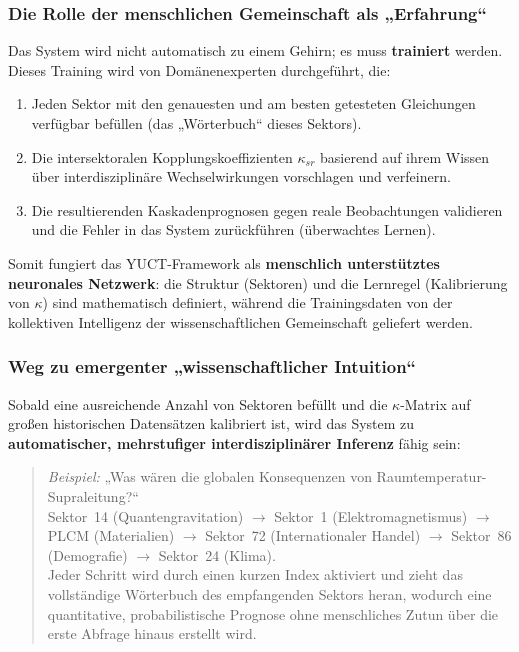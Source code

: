 \documentclass[13pt,a4paper]{article}
\begin{document}
	\subsubsection*{Die Rolle der menschlichen Gemeinschaft als „Erfahrung“}
	Das System wird nicht automatisch zu einem Gehirn; es muss \textbf{trainiert} werden.
	Dieses Training wird von Domänenexperten durchgeführt, die:
	\begin{enumerate}[leftmargin=*]
		\item Jeden Sektor mit den genauesten und am besten getesteten Gleichungen
		verfügbar befüllen (das „Wörterbuch“ dieses Sektors).
		\item Die intersektoralen Kopplungskoeffizienten
		\(\kappa_{sr}\) basierend auf ihrem Wissen über interdisziplinäre
		Wechselwirkungen vorschlagen und verfeinern.
		\item Die resultierenden Kaskadenprognosen gegen reale
		Beobachtungen validieren und die Fehler in das System zurückführen (überwachtes
		Lernen).
	\end{enumerate}
	Somit fungiert das YUCT-Framework als \textbf{menschlich unterstütztes neuronales Netzwerk}:
	die Struktur (Sektoren) und die Lernregel (Kalibrierung von \(\kappa\)) sind
	mathematisch definiert, während die Trainingsdaten von der kollektiven
	Intelligenz der wissenschaftlichen Gemeinschaft geliefert werden.
	
	\subsubsection*{Weg zu emergenter „wissenschaftlicher Intuition“}
	Sobald eine ausreichende Anzahl von Sektoren befüllt und die \(\kappa\)-Matrix
	auf großen historischen Datensätzen kalibriert ist, wird das System zu
	\textbf{automatischer, mehrstufiger interdisziplinärer Inferenz} fähig sein:
	
	\begin{quote}
		\emph{Beispiel:} „Was wären die globalen Konsequenzen von Raumtemperatur-
		Supraleitung?“\\
		\noindent
		Sektor~14 (Quantengravitation) \(\to\) Sektor~1 (Elektromagnetismus) \(\to\)
		PLCM (Materialien) \(\to\) Sektor~72 (Internationaler Handel) \(\to\)
		Sektor~86 (Demografie) \(\to\) Sektor~24 (Klima).\\
		\noindent
		Jeder Schritt wird durch einen kurzen Index aktiviert und zieht das vollständige Wörterbuch
		des empfangenden Sektors heran, wodurch eine quantitative, probabilistische Prognose ohne
		menschliches Zutun über die erste Abfrage hinaus erstellt wird.
	\end{quote}
	
\end{document}
